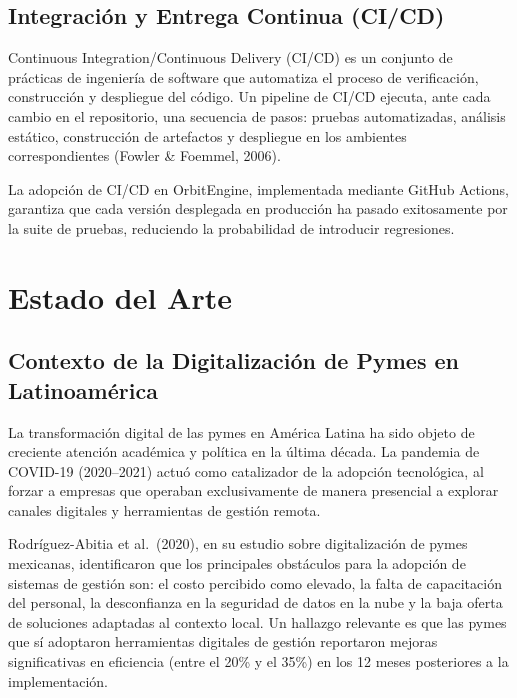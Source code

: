 \subsection{Integración y Entrega Continua (CI/CD)}\label{integraciuxf3n-y-entrega-continua-cicd}

Continuous Integration/Continuous Delivery (CI/CD) es un conjunto de prácticas de ingeniería de software que automatiza el proceso de verificación, construcción y despliegue del código. Un pipeline de CI/CD ejecuta, ante cada cambio en el repositorio, una secuencia de pasos: pruebas automatizadas, análisis estático, construcción de artefactos y despliegue en los ambientes correspondientes (Fowler \& Foemmel, 2006).

La adopción de CI/CD en OrbitEngine, implementada mediante GitHub Actions, garantiza que cada versión desplegada en producción ha pasado exitosamente por la suite de pruebas, reduciendo la probabilidad de introducir regresiones.

\section{Estado del Arte}\label{estado-del-arte}

\subsection{Contexto de la Digitalización de Pymes en Latinoamérica}\label{contexto-de-la-digitalizaciuxf3n-de-pymes-en-latinoamuxe9rica}

La transformación digital de las pymes en América Latina ha sido objeto de creciente atención académica y política en la última década. La pandemia de COVID-19 (2020--2021) actuó como catalizador de la adopción tecnológica, al forzar a empresas que operaban exclusivamente de manera presencial a explorar canales digitales y herramientas de gestión remota.

Rodríguez-Abitia et al.~(2020), en su estudio sobre digitalización de pymes mexicanas, identificaron que los principales obstáculos para la adopción de sistemas de gestión son: el costo percibido como elevado, la falta de capacitación del personal, la desconfianza en la seguridad de datos en la nube y la baja oferta de soluciones adaptadas al contexto local. Un hallazgo relevante es que las pymes que sí adoptaron herramientas digitales de gestión reportaron mejoras significativas en eficiencia (entre el 20\% y el 35\%) en los 12 meses posteriores a la implementación.

